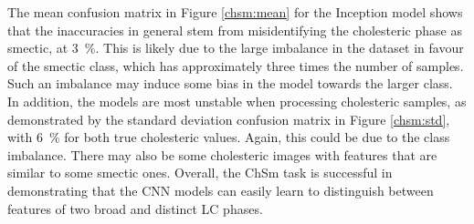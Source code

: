 \documentclass[12pt]{article}
\begin{document}
The mean confusion matrix in Figure \ref{chsm:mean} for the Inception model shows that the inaccuracies in general stem from misidentifying the cholesteric phase as smectic, at \SI{3}{\percent}. This is likely due to the large imbalance in the dataset in favour of the smectic class, which has approximately three times the number of samples. Such an imbalance may induce some bias in the model towards the larger class. In addition, the models are most unstable when processing cholesteric samples, as demonstrated by the standard deviation confusion matrix in Figure \ref{chsm:std}, with \SI{6}{\percent} for both true cholesteric values. Again, this could be due to the class imbalance. There may also be some cholesteric images with features that are similar to some smectic ones. Overall, the ChSm task is successful in demonstrating that the CNN models can easily learn to distinguish between features of two broad and distinct LC phases.
\end{document}
